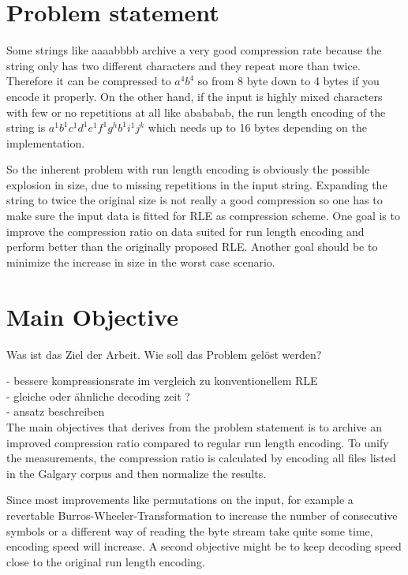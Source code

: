 \section{Problem statement}
\label{ch:Introduction:sec:Problem statement}
\par{
Some strings like aaaabbbb archive a very good compression rate because the string only has two different characters and they repeat more than twice. Therefore it can be compressed to $a^4b^4$ so from 8 byte down to 4 bytes if you encode it properly. On the other hand, if the input is highly mixed characters with few or no repetitions at all like abababab, the run length encoding of the string is $a^1b^1c^1d^1e^1f^1g^hb^1i^1j^k$ which needs up to 16 bytes depending on the implementation.}
\par{
So the inherent problem with run length encoding is obviously the possible explosion in size, due to missing repetitions in the input string. Expanding the string to twice the original size is not really a good compression so one has to make sure the input data is fitted for RLE as compression scheme. One goal is to improve the compression ratio on data suited for run length encoding and perform better than the originally proposed RLE. Another goal should be to minimize the increase in size in the worst case scenario.}

\section{Main Objective}
\label{ch:Introduction:sec:Main Objective}

Was ist das Ziel der Arbeit. Wie soll das Problem gelöst werden?

- bessere kompressionsrate im vergleich zu konventionellem RLE\\
- gleiche oder ähnliche decoding zeit ?\\
- ansatz beschreiben\\

The main objectives that derives from the problem statement is to archive an improved compression ratio compared to regular run length encoding. To unify the measurements, the compression ratio is calculated by encoding all files listed in the Galgary corpus and then normalize the results. \par
Since most improvements like permutations on the input, for example a revertable Burros-Wheeler-Transformation to increase the number of consecutive symbols or a different way of reading the byte stream take quite some time, encoding speed will increase. A second objective might be to keep decoding speed close to the original run length encoding.

